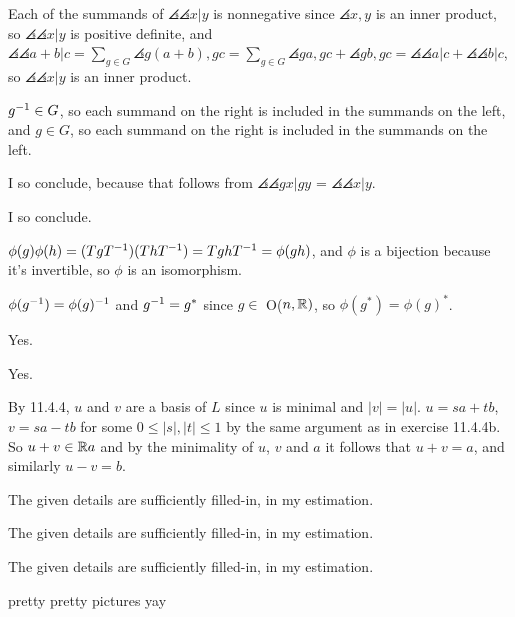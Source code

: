 \documentclass[11pt, oneside]{article}   	%
\begin{document}
\item \be
\item Each of the summands of $\angles{\angles{x|y}}$ is nonnegative since $\angles{x, y}$ is an inner product, so $\angles{\angles{x|y}}$ is positive definite, and $\angles{\angles{a + b|c}} = \sum_{g \in G} \angles{g(a+b), gc} = \sum_{g \in G}\angles{ga, gc} + \angles{gb, gc} = \angles{\angles{a|c}} + \angles{\angles{b|c}}$, so $\angles{\angles{x|y}}$ is an inner product.
\item $g^{-1} \in G$, so each summand on the right is included in the summands on the left, and $g \in G$, so each summand on the right is included in the summands on the left.
\item I so conclude, because that follows from $\angles{\angles{gx|gy}}$ = $\angles{\angles{x|y}}$.
\item I so conclude.
\ee
\item \be
\item $\phi(g)\phi(h) = (TgT^{-1})(ThT^{-1}) = TghT^{-1} = \phi(gh)$, and $\phi$ is a bijection because it's invertible, so $\phi$ is an isomorphism.
\item $\phi(g^{-1}) = \phi(g)^{-1}$ and $g^{-1} = g^*$ since $g \in$ O($n, \mathbb{R})$, so $\phi(g^*) = \phi(g)^*$.
\item Yes.
\item Yes.
\ee
\item By 11.4.4, $u$ and $v$ are a basis of $L$ since $u$ is minimal and $|v| = |u|$. $u=sa+tb$, $v=sa-tb$ for some $0 \le |s|, |t| \le 1$ by the same argument as in exercise 11.4.4b. So $u + v \in \mathbb{R} a$ and by the minimality of $u$, $v$ and $a$ it follows that $u + v = a$, and similarly $u - v = b$.
\item The given details are sufficiently filled-in, in my estimation.
\item The given details are sufficiently filled-in, in my estimation.
\item The given details are sufficiently filled-in, in my estimation.
\item pretty pretty pictures yay
\ee
\end{document}
